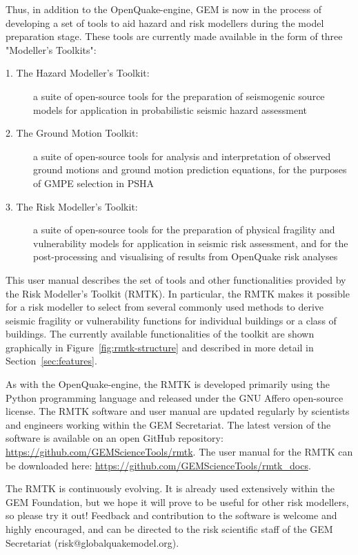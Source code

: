 Thus, in addition to the OpenQuake-engine, GEM is now in the process of developing a set of tools to aid hazard and risk modellers during the model preparation stage. These tools are currently made available in the form of three "Modeller’s Toolkits":
\begin{description}
\item[1. The Hazard Modeller’s Toolkit:] a suite of open-source tools for the preparation of seismogenic source models for application in probabilistic seismic hazard assessment \citep{hmtk_guide}
\item[2. The Ground Motion Toolkit:] a suite of open-source tools for analysis and interpretation of observed ground motions and ground motion prediction equations, for the purposes of GMPE selection in PSHA
\item[3. The Risk Modeller's Toolkit:] a suite of open-source tools for the preparation of physical fragility and vulnerability models for application in seismic risk assessment, and for the post-processing and visualising of results from OpenQuake risk analyses
\end{description}

This user manual describes the set of tools and other functionalities provided by the Risk Modeller's Toolkit (RMTK). In particular, the RMTK makes it possible for a risk modeller to select from several commonly used methods to derive seismic fragility or vulnerability functions for individual buildings or a class of buildings. The currently available functionalities of the toolkit are shown graphically in Figure~\ref{fig:rmtk-structure} and described in more detail in Section~\ref{sec:features}.

As with the OpenQuake-engine, the RMTK is developed primarily using the Python programming language and released under the GNU Affero open-source license. The RMTK software and user manual are updated regularly by scientists and engineers working within the GEM Secretariat. The latest version of the software is available on an open GitHub repository: \href{https://github.com/GEMScienceTools/rmtk}{https://github.com/GEMScienceTools/rmtk}. The user manual for the RMTK can be downloaded here: \href{https://github.com/GEMScienceTools/rmtk_docs}{https://github.com/GEMScienceTools/rmtk\_docs}.

The RMTK is continuously evolving. It is already used extensively within the GEM Foundation, but we hope it will prove to be useful for other risk modellers, so please try it out! Feedback and contribution to the software is welcome and highly encouraged, and can be directed to the risk scientific staff of the GEM Secretariat (risk@globalquakemodel.org).

